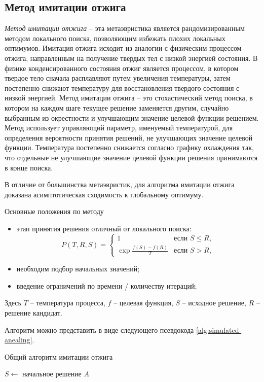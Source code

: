 \subsection{Метод имитации отжига}
\emph{Метод имитации отжига} -- эта метаэвристика является рандомизированным методом локального поиска, 
позволяющим избежать плохих локальных оптимумов. Имитация отжига исходит из аналогии с физическим процессом 
отжига, направленным на получение твердых тел с низкой энергией состояния. В физике конденсированного 
состояния отжиг является процессом, в котором твердое тело сначала расплавляют путем увеличения температуры, 
затем постепенно снижают температуру для восстановления твердого состояния с низкой энергией. Метод имитации 
отжига -- это стохастический метод поиска, в котором на каждом шаге текущее решение заменяется другим, 
случайно выбранным из окрестности и улучшающим значение целевой функции решением. Метод использует 
управляющий параметр, именуемый температурой, для определения вероятности принятия решений, не улучшающих 
значение целевой функции. Температура постепенно снижается согласно графику охлаждения так, что отдельные не 
улучшающие значение целевой функции решения принимаются в конце поиска.

В отличие от большинства метаэвристик, для алгоритма имитации отжига доказана асимптотическая сходимость к 
глобальному оптимуму. 

Основные положения по методу
\begin{itemize}
    \item этап принятия решения отличный от локального поиска:
    \[
        P(T, R, S)= \left\{\begin{array}{cc}
            1                       & \text{если } S \leq R, \\
            \exp\frac{f(S)-f(R)}{T} & \text{если } S > R,
        \end{array}\right.
    \]
    \item необходим подбор начальных значений;
    \item введение ограничений по времени / количеству итераций;
\end{itemize}

Здесь \( T \) -- температура процесса, \( f \) -- целевая функция, \( S \) -- исходное решение, 
\( R \) -- решение кандидат.

Алгоритм можно представить в виде следующего псевдокода \ref{alg:simulated-anealing}.

\newpage

\begin{algorithm}[ht!]
    \caption{Общий алгоритм имитации отжига}
    \( S \leftarrow \) начальное решение \( A \)\;
    \label{alg:simulated-anealing}
\end{algorithm}

